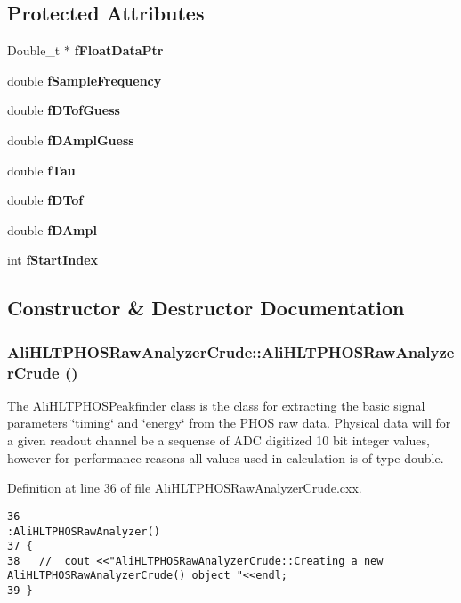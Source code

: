 \subsection*{Protected Attributes}
\begin{CompactItemize}
\item 
Double\_\-t $\ast$ {\bf f\-Float\-Data\-Ptr}
\item 
double {\bf f\-Sample\-Frequency}
\item 
double {\bf f\-DTof\-Guess}
\item 
double {\bf f\-DAmpl\-Guess}
\item 
double {\bf f\-Tau}
\item 
double {\bf f\-DTof}
\item 
double {\bf f\-DAmpl}
\item 
int {\bf f\-Start\-Index}
\end{CompactItemize}


\subsection{Constructor \& Destructor Documentation}
\subsubsection{\setlength{\rightskip}{0pt plus 5cm}Ali\-HLTPHOSRaw\-Analyzer\-Crude::Ali\-HLTPHOSRaw\-Analyzer\-Crude ()}\label{classAliHLTPHOSRawAnalyzerCrude_AliHLTPHOSRawAnalyzerCrudea0}


The Ali\-HLTPHOSPeakfinder class is the class for extracting the basic signal parameters \char`\"{}timing\char`\"{} and \char`\"{}energy\char`\"{} from the PHOS raw data. Physical data will for a given readout channel be a sequense of ADC digitized 10 bit integer values, however for performance reasons all values used in calculation is of type double. 

Definition at line 36 of file Ali\-HLTPHOSRaw\-Analyzer\-Crude.cxx.

\footnotesize\begin{verbatim}36                                                       :AliHLTPHOSRawAnalyzer() 
37 {
38   //  cout <<"AliHLTPHOSRawAnalyzerCrude::Creating a new AliHLTPHOSRawAnalyzerCrude() object "<<endl;
39 }
\end{verbatim}\normalsize 


